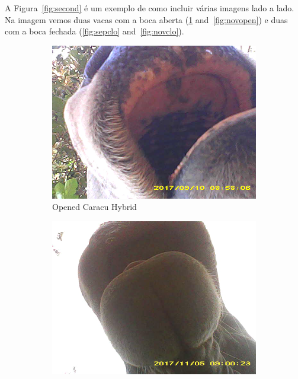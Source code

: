 \documentclass[preprint,10pt,5p]{elsarticle}
\begin{document}
A Figura~\ref{fig:second} é um exemplo de como incluir várias imagens lado a lado. Na imagem vemos duas vacas com a boca aberta (\ref{fig:sepopen} and~\ref{fig:novopen}) e duas com a boca fechada (\ref{fig:sepclo} and~\ref{fig:novclo}). 


\begin{figure}
  \centering
  \begin{subfigure}{0.2\textwidth}
    \includegraphics[width=1\linewidth]{figures/sep_open_caranelo.png} 
    \caption{Opened Caracu Hybrid}
    \label{fig:sepopen}
  \end{subfigure}
  \quad
  \begin{subfigure}{0.2\textwidth}
     \includegraphics[width=1\linewidth]{figures/nov_open_nelore.png}

\end{subfigure}
\end{figure}
\end{document}
